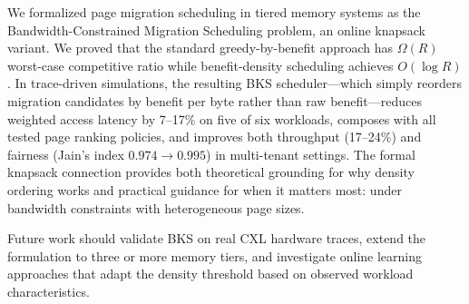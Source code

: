\documentclass{article}
\begin{document}
We formalized page migration scheduling in tiered memory systems as the Bandwidth-Constrained Migration Scheduling problem, an online knapsack variant. We proved that the standard greedy-by-benefit approach has $\Omega(R)$ worst-case competitive ratio while benefit-density scheduling achieves $O(\log R)$. In trace-driven simulations, the resulting BKS scheduler---which simply reorders migration candidates by benefit per byte rather than raw benefit---reduces weighted access latency by 7--17\% on five of six workloads, composes with all tested page ranking policies, and improves both throughput (17--24\%) and fairness (Jain's index $0.974 \to 0.995$) in multi-tenant settings. The formal knapsack connection provides both theoretical grounding for why density ordering works and practical guidance for when it matters most: under bandwidth constraints with heterogeneous page sizes.

Future work should validate BKS on real CXL hardware traces, extend the formulation to three or more memory tiers, and investigate online learning approaches that adapt the density threshold based on observed workload characteristics.



\end{document}
